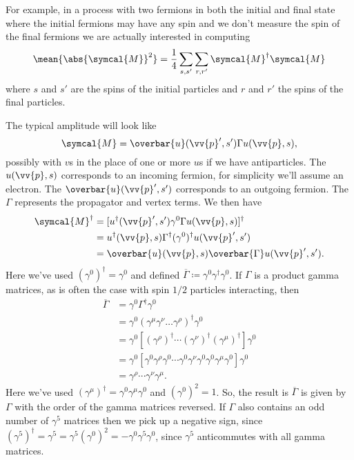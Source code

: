 \documentclass[fleqn]{NotesClass}
\newcommand{\hermit}{{\dagger}}
\newcommand{\amplitude}{\symcal{M}}
\newcommand{\diracadjoint}[1]{\overbar{#1}}
\begin{document}
    For example, in a process with two fermions in both the initial and final state where the initial fermions may have any spin and we don't measure the spin of the final fermions we are actually interested in computing
    \begin{equation}
        \mean{\abs{\amplitude}^2} = \frac{1}{4} \sum_{s,s'} \sum_{r, r'} \amplitude^\hermit \amplitude
    \end{equation}
    where \(s\) and \(s'\) are the spins of the initial particles and \(r\) and \(r'\) the spins of the final particles.
    
    The typical amplitude will look like
    \begin{equation}
        \amplitude = \diracadjoint{u}(\vv{p}', s') \Gamma u(\vv{p}, s),
    \end{equation}
    possibly with \(v\)s in the place of one or more \(u\)s if we have antiparticles.
    The \(u(\vv{p}, s)\) corresponds to an incoming fermion, for simplicity we'll assume an electron.
    The \(\diracadjoint{u}(\vv{p}', s')\)  corresponds to an outgoing fermion.
    The \(\Gamma\) represents the propagator and vertex terms.
    We then have
    \begin{align}
        \amplitude^\hermit &= [u^\hermit(\vv{p}', s') \gamma^0 \Gamma u(\vv{p}, s)]^\hermit\\
        &= u^\hermit(\vv{p}, s) \Gamma^\hermit (\gamma^0)^\hermit u(\vv{p}', s')\\
        &= \diracadjoint{u}(\vv{p}, s) \diracadjoint{\Gamma} u(\vv{p}', s').
    \end{align}
    Here we've used \((\gamma^0)^\hermit = \gamma^0\) and defined \(\diracadjoint{\Gamma} \coloneqq \gamma^0\gamma^\hermit \gamma^0\).
    If \(\Gamma\) is a product gamma matrices, as is often the case with spin \(1/2\) particles interacting, then
    \begin{align}
        \diracadjoint{\Gamma} &= \gamma^0\Gamma^\hermit \gamma^0\\
        &= \gamma^0 (\gamma^\mu \gamma^\nu \dotsc \gamma^\rho)^\hermit \gamma^0\\
        &= \gamma^0 [(\gamma^\rho)^\hermit \dotsm (\gamma^\nu)^\hermit (\gamma^\mu)^\hermit] \gamma^0\\
        &= \gamma^0 [\gamma^0\gamma^\rho\gamma^0 \dotsm \gamma^0\gamma^\nu\gamma^0\gamma^0\gamma^\mu\gamma^0]\gamma^0\\
        &= \gamma^\rho \dotsm \gamma^\nu \gamma^\mu.
    \end{align}
    Here we've used \((\gamma^\mu)^\hermit = \gamma^0 \gamma^\mu \gamma^0\) and \((\gamma^0)^2 = 1\).
    So, the result is \(\diracadjoint{\Gamma}\) is given by \(\Gamma\) with the order of the gamma matrices reversed.
    If \(\Gamma\) also contains an odd number of \(\gamma^5\) matrices then we pick up a negative sign, since \((\gamma^5)^\hermit = \gamma^5 = \gamma^5(\gamma^0)^2 = -\gamma^0\gamma^5\gamma^0\), since \(\gamma^5\) anticommutes with all gamma matrices.
    
\end{document}
